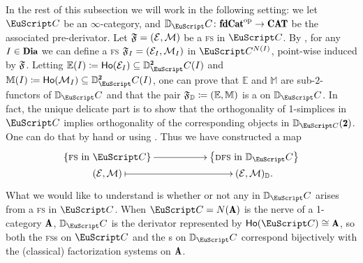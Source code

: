 In the rest of this subsection we will work in the following setting: we let $\iC$ be an $\infty$-category, and $\D_\iC\colon \fincat^\opp\to \Cat$ be the associated pre-derivator. Let $\mathfrak{F}=(\mathcal{E},\mathcal{M})$ be a \textsc{fs} in $\iC$. By \cite[§\textbf{24.10}]{joyal2008notes}, for any $I\in \Dia$ we can define a \textsc{fs} $\mathfrak{F}_I=(\mathcal{E}_I,\mathcal{M}_I)$ in $\iC^{N(I)}$, point-wise induced by $\mathfrak{F}$. Letting $\mathbb E(I) \coloneqq \ho(\E_I)\subseteq \D^\due_\iC(I)$ and $\mathbb M(I) \coloneqq \ho(\M_I)\subseteq \D^\due_\iC(I)$, one can prove that $\mathbb E$ and $\mathbb M$ are sub-$2$-functors of $\D_\iC$ and that the pair $\mathfrak{F}_{\mathbb{D}} \coloneqq (\mathbb E,\mathbb M)$ is a \dpfs on $\D_\iC$. In fact, the unique delicate part is to show that the orthogonality of 1-simplices in $\iC$ implies orthogonality of the corresponding objects in $\D_{\iC}(\due)$. One can do that by hand or using \cite[Lem. \textbf{5.2.8.22}]{HTT}. 
Thus we have constructed a map 
\begin{equation}\label{the_map}
\xymatrix@R=0pt{
\left\{\text{\textsc{fs} in $\iC$}\right\}\ar@{->}[rr]&&\left\{\text{\dfs in $\D_\iC$}\right\}\\
(\E,\M)\ar@{|->}[rr]&&(\E,\M)_\D.
}
\end{equation}
What we would like to understand is whether or not any \dfs in $\D_\iC$ arises from a \textsc{fs} in $\iC$. 
%
%
%
%
When $\iC=N(\A)$ is the nerve of a 1-category $\A$, $\D_\iC$ is the derivator represented by $\ho(\iC)\cong\A$, so both the \textsc{fs}s on $\iC$ and the  {\dfs}s on $\D_\iC$ correspond bijectively with the (classical) factorization systems on $\A$. 

